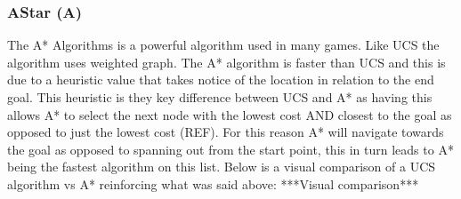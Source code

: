 \subsubsection{AStar (A\*)}
The A* Algorithms is a powerful algorithm used in many games. Like UCS the algorithm uses weighted graph. The A* algorithm is faster than UCS and this is due to a heuristic value that takes notice of the location in relation to the end goal. This heuristic is they key difference between UCS and A* as having this allows A* to select the next node with the lowest cost AND closest to the goal as opposed to just the lowest cost (REF). For this reason A* will navigate towards the goal as opposed to spanning out from the start point, this in turn leads to A* being the fastest algorithm on this list. 
Below is a visual comparison of a UCS algorithm vs A* reinforcing what was said above:
***Visual comparison***

